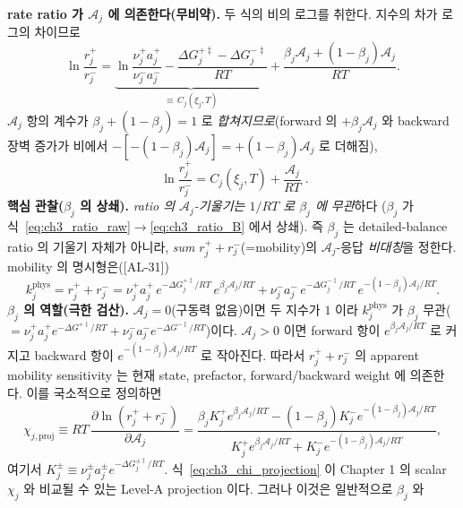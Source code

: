 \documentclass[11pt,a4paper]{article}
\newcommand{\AL}[1]{\textsf{[AL-#1]}}
\begin{document}
\textbf{rate ratio 가 $\mathcal A_j$ 에 의존한다(무비약).} 두 식의 비의 로그를 취한다. 지수의 차가 로그의 차이므로
\begin{equation}
\ln\frac{r_j^+}{r_j^-}=\underbrace{\ln\frac{\nu_j^+a_j^+}{\nu_j^-a_j^-}-\frac{\Delta G_j^{+\ddagger}-\Delta G_j^{-\ddagger}}{RT}}_{\equiv\,C_j(\xi_j,T)}
+\frac{\beta_j\mathcal A_j+(1-\beta_j)\mathcal A_j}{RT}.
\label{eq:ch3_ratio_raw}
\end{equation}
$\mathcal A_j$ 항의 계수가 $\beta_j+(1-\beta_j)=1$ 로 \emph{합쳐지므로}(forward 의 $+\beta_j\mathcal A_j$ 와
backward 장벽 증가가 비에서 $-[-(1-\beta_j)\mathcal A_j]=+(1-\beta_j)\mathcal A_j$ 로 더해짐),
\begin{equation}
\boxed{\;\ln\frac{r_j^+}{r_j^-}=C_j(\xi_j,T)+\frac{\mathcal A_j}{RT}\;.}
\label{eq:ch3_ratio_B}
\end{equation}
\textbf{핵심 관찰($\beta_j$ 의 상쇄).} \emph{ratio 의 $\mathcal A_j$-기울기는 $1/RT$ 로 $\beta_j$ 에 무관}하다
($\beta_j$ 가 식~\eqref{eq:ch3_ratio_raw}$\to$\eqref{eq:ch3_ratio_B} 에서 상쇄). 즉 $\beta_j$ 는 detailed-balance
ratio 의 기울기 자체가 아니라, \emph{sum} $r_j^++r_j^-$(=mobility)의 $\mathcal A_j$-응답 \emph{비대칭}을 정한다.
mobility 의 명시형은(\AL{31})
\begin{equation}
k_j^{\mathrm{phys}}=r_j^++r_j^-
=\nu_j^+a_j^+\,e^{-\Delta G_j^{+\ddagger}/RT}\,e^{\beta_j\mathcal A_j/RT}
+\nu_j^-a_j^-\,e^{-\Delta G_j^{-\ddagger}/RT}\,e^{-(1-\beta_j)\mathcal A_j/RT}.
\label{eq:ch3_ksum}
\end{equation}
\textbf{$\beta_j$ 의 역할(극한 검산).} $\mathcal A_j=0$(구동력 없음)이면 두 지수가 $1$ 이라 $k_j^{\mathrm{phys}}$ 가
$\beta_j$ 무관($=\nu_j^+a_j^+e^{-\Delta G^{+\ddagger}/RT}+\nu_j^-a_j^-e^{-\Delta G^{-\ddagger}/RT}$)이다. $\mathcal A_j>0$
이면 forward 항이 $e^{\beta_j\mathcal A_j/RT}$ 로 커지고 backward 항이 $e^{-(1-\beta_j)\mathcal A_j/RT}$ 로 작아진다.
따라서 $r_j^++r_j^-$ 의 apparent mobility sensitivity 는 현재 state, prefactor, forward/backward weight 에 의존한다.
이를 국소적으로 정의하면
\begin{equation}
\chi_{j,\mathrm{proj}}\equiv RT\,\frac{\partial \ln (r_j^++r_j^-)}{\partial \mathcal A_j}
=\frac{\beta_j K_j^+e^{\beta_j\mathcal A_j/RT}-(1-\beta_j)K_j^-e^{-(1-\beta_j)\mathcal A_j/RT}}
{K_j^+e^{\beta_j\mathcal A_j/RT}+K_j^-e^{-(1-\beta_j)\mathcal A_j/RT}},
\label{eq:ch3_chi_projection}
\end{equation}
여기서 $K_j^\pm\equiv\nu_j^\pm a_j^\pm e^{-\Delta G_j^{\pm\ddagger}/RT}$. 식~\eqref{eq:ch3_chi_projection} 이
Chapter 1 의 scalar $\chi_j$ 와 비교될 수 있는 Level-A projection 이다. 그러나 이것은 일반적으로 $\beta_j$ 와
\end{document}
